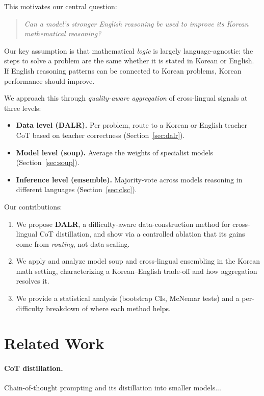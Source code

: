 \documentclass[11pt]{article}
\begin{document}
This motivates our central question:
\begin{quote}
\emph{Can a model's stronger English reasoning be used to improve its
Korean mathematical reasoning?}
\end{quote}
Our key assumption is that mathematical \emph{logic} is largely
language-agnostic: the steps to solve a problem are the same whether it
is stated in Korean or English. If English reasoning patterns can be
connected to Korean problems, Korean performance should improve.

We approach this through \emph{quality-aware aggregation} of
cross-lingual signals at three levels:
\begin{itemize}
  \item \textbf{Data level (DALR).} Per problem, route to a Korean or
  English teacher CoT based on teacher correctness
  (Section~\ref{sec:dalr}).
  \item \textbf{Model level (soup).} Average the weights of specialist
  models \citep{wortsman2022soup} (Section~\ref{sec:soup}).
  \item \textbf{Inference level (ensemble).} Majority-vote across models
  reasoning in different languages (Section~\ref{sec:clsc}).
\end{itemize}

Our contributions:
\begin{enumerate}
  \item We propose \textbf{DALR}, a difficulty-aware data-construction
  method for cross-lingual CoT distillation, and show via a controlled
  ablation that its gains come from \emph{routing}, not data scaling.
  \item We apply and analyze model soup and cross-lingual ensembling in
  the Korean math setting, characterizing a Korean--English trade-off
  and how aggregation resolves it.
  \item We provide a statistical analysis (bootstrap CIs, McNemar tests)
  and a per-difficulty breakdown of where each method helps.
\end{enumerate}

\section{Related Work}
\label{sec:related}

\paragraph{CoT distillation.} %
Chain-of-thought prompting \citep{wei2022cot} and its distillation into
smaller models...
\end{document}
